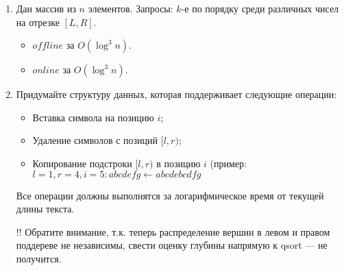 \begin{enumerate}
	\item Дан массив из $n$ элементов. Запросы: $k$-е по порядку среди различных чисел на отрезке $[L, R]$.
	\begin{itemize}
		\item $offline$ за $O(\log^3 n)$.
		\item $online$ за $O(\log^3 n)$.
	\end{itemize}
	
	\item Придумайте структуру данных, которая поддерживает следующие операции:
	
	\begin{itemize}
		\item Вставка символа на позицию $i$;
		\item Удаление символов с позиций $[l, r)$;
		\item Копирование подстроки $[l, r)$ в позицию $i$ (пример: $l = 1, r = 4, i = 5 : abcdefg \leftarrow abcdebcdfg$
	\end{itemize}
	
	Все операции должны выполнятся за логарифмическое время от текущей длины текста.
		
	!! Обратите внимание, т.к. теперь распределение вершин в левом и правом поддереве не 
	независимы, свести оценку глубины напрямую к qsort — не получится.
		
\end{enumerate}


